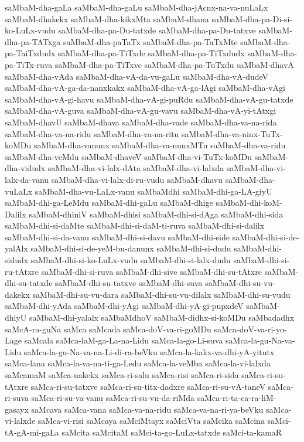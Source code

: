 {saMbaM-dha-gaLa
saMbaM-dha-gaLu
saMbaM-dha-jAcnx-na-va-nuLaLx
saMbaM-dhakekx
saMbaM-dha-kikxMta
saMbaM-dhana
saMbaM-dha-pa-Di-si-ko-LuLx-vudu
saMbaM-dha-pa-Du-tatxde
saMbaM-dha-pa-Du-tatxve
saMbaM-dha-pa-TATxga
saMbaM-dha-paTaTx
saMbaM-dha-pa-TaTxMte
saMbaM-dha-pa-TaiTxdudx
saMbaM-dha-pa-TiTxde
saMbaM-dha-pa-TiTxdudx
saMbaM-dha-pa-TiTx-ruva
saMbaM-dha-pa-TiTxve
saMbaM-dha-pa-TuTxdu
saMbaM-dhavA
saMbaM-dha-vAda
saMbaM-dha-vA-da-vu-gaLu
saMbaM-dha-vA-dudeV
saMbaM-dha-vA-ga-da-nanxkakx
saMbaM-dha-vA-ga-lAgi
saMbaM-dha-vAgi
saMbaM-dha-vA-gi-havu
saMbaM-dha-vA-gi-puRdu
saMbaM-dha-vA-gu-tatxde
saMbaM-dha-vA-guva
saMbaM-dha-vA-gu-vavu
saMbaM-dha-vA-yi-tAtxgi
saMbaM-dhavU
saMbaM-dhava
saMbaM-dha-vade
saMbaM-dha-va-na-rida
saMbaM-dha-va-na-ridu
saMbaM-dha-va-na-ritu
saMbaM-dha-va-ninx-TuTx-koMDu
saMbaM-dha-vanunx
saMbaM-dha-va-nunxMTu
saMbaM-dha-va-ridu
saMbaM-dha-veMdu
saMbaM-dhaveV
saMbaM-dha-vi-TuTx-koMDu
saMbaM-dha-vidudx
saMbaM-dha-vi-lalx-dAta
saMbaM-dha-vi-lalxda
saMbaM-dha-vi-lalx-da-vanu
saMbaM-dha-vi-lalx-di-ru-vudu
saMbaM-dhavu
saMbaM-dha-vuLaLx
saMbaM-dha-vu-LaLx-vanu
saMbaMdhi
saMbaM-dhi-ga-LA-giyU
saMbaM-dhi-ga-LeMdu
saMbaM-dhi-gaLu
saMbaM-dhige
saMbaM-dhi-koM-Dalilx
saMbaM-dhiniV
saMbaM-dhisi
saMbaM-dhi-si-dAga
saMbaM-dhi-sida
saMbaM-dhi-si-daMte
saMbaM-dhi-si-daM-ti-ruva
saMbaM-dhi-si-dalilx
saMbaM-dhi-si-da-vanu
saMbaM-dhi-si-davu
saMbaM-dhi-side
saMbaM-dhi-si-de-yalAlx
saMbaM-dhi-si-de-yeM-bu-danunx
saMbaM-dhi-si-dudu
saMbaM-dhi-sidudx
saMbaM-dhi-si-ko-LuLx-vudu
saMbaM-dhi-si-lalx-dudu
saMbaM-dhi-si-ru-tAtxre
saMbaM-dhi-si-ruva
saMbaM-dhi-sive
saMbaM-dhi-su-tAtxre
saMbaM-dhi-su-tatxde
saMbaM-dhi-su-tatxve
saMbaM-dhi-suva
saMbaM-dhi-su-vu-dakekx
saMbaM-dhi-su-vu-dara
saMbaM-dhi-su-vu-dilalx
saMbaM-dhi-su-vudu
saMbaM-dhi-yAda
saMbaM-dhi-yAgi
saMbaM-dhi-yA-gi-pupxdeV
saMbaM-dhiyU
saMbaM-dhi-yalalx
saMbaMdhoV
saMbaM-didhx-si-koMDu
saMbadadhx
saMcA-ra-guNa
saMca
saMcada
saMca-doV-va-ri-goMDu
saMca-doV-va-ri-yo-Lage
saMcala
saMca-laM-ga-La-na-Lidu
saMca-la-go-Li-suva
saMca-la-gu-Na-va-Lidu
saMca-la-gu-Na-va-na-Li-di-ra-beVku
saMca-la-kakx-va-dhi-yA-yitutx
saMca-lana
saMca-la-va-na-ti-ga-Ledu
saMca-la-veMba
saMca-la-vi-lalxda
saMcamaM
saMca-nakekx
saMca-ri-salu
saMca-risi
saMca-ri-sida
saMca-ri-su-tAtxre
saMca-ri-su-tatxve
saMca-ri-su-titx-dadxre
saMca-ri-su-vA-taneV
saMca-ri-suva
saMca-ri-su-va-vanu
saMca-ri-su-vu-da-riMda
saMca-ri-ta-ca-ra-liM-gasayx
saMcava
saMca-vana
saMca-va-na-ridu
saMca-va-na-ri-ya-beVku
saMca-vi-lalxde
saMca-vi-risi
saMcaya
saMciMtayx
saMciVta
saMcika
saMcina
saMci-tA-gA-mi-gaLa
saMcita
saMcitaM
saMci-ta-go-LuLx-tatxde
saMci-ta-kamaR
}
